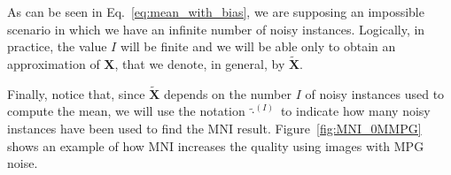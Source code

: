\documentclass{article}
\begin{document}

As can be seen in Eq.~\ref{eq:mean_with_bias}, we are supposing an
impossible scenario in which we have an infinite number of noisy
instances. Logically, in practice, the value $I$ will be finite and we
will be able only to obtain an approximation of ${\mathbf X}$, that we
denote, in general, by $\tilde{\mathbf X}$.

Finally, notice that, since $\tilde{\mathbf X}$ depends on the number
$I$ of noisy instances used to compute the mean, we will use the
notation $\tilde{\cdot}^{(I)}$ to indicate how many noisy instances have
been used to find the MNI result. Figure~\ref{fig:MNI_0MMPG}
shows an example of how MNI increases the quality using images with
MPG noise.
  
\end{document}
